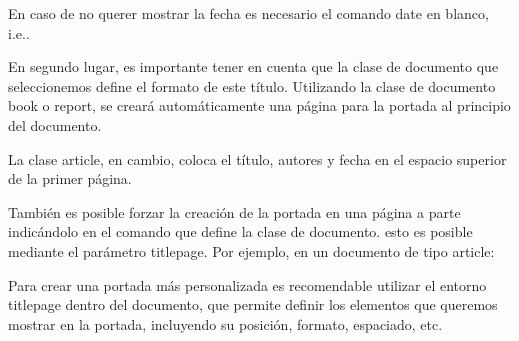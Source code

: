 \documentclass[11pt, a4paper]{article}
\begin{document}







En caso de no querer mostrar la fecha es necesario el comando date en blanco, i.e..

En segundo lugar, es importante tener en cuenta que la clase de documento que seleccionemos define el formato de este título. Utilizando la clase de documento book o report, se creará automáticamente una página para la portada al principio del documento. 

La clase article, en cambio, coloca el título, autores y fecha en el espacio superior de la primer página.

También es posible forzar la creación de la portada en una página a parte indicándolo en el comando que define la clase de documento. esto es posible mediante el parámetro titlepage.
Por ejemplo, en un documento de tipo article:


Para crear una portada más personalizada es recomendable utilizar el entorno titlepage dentro del documento, que permite definir los elementos que queremos mostrar en la portada, incluyendo su posición, formato, espaciado, etc.











\end{document}
